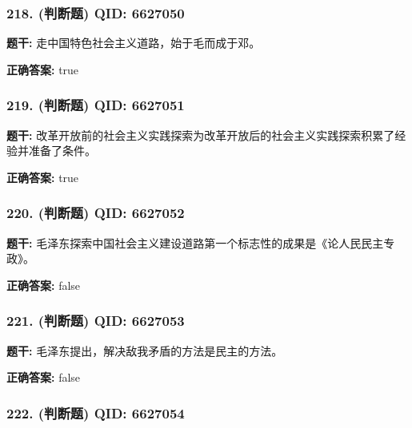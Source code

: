 \documentclass[12pt,UTF8]{ctexart}
\begin{document}
\subsubsection*{218. (判断题) \small QID: 6627050}

\textbf{题干:}
走中国特色社会主义道路，始于毛而成于邓。

\textbf{正确答案:}
true

\vspace{0.3em}\hrulefill\vspace{0.7em}

\subsubsection*{219. (判断题) \small QID: 6627051}

\textbf{题干:}
改革开放前的社会主义实践探索为改革开放后的社会主义实践探索积累了经验并准备了条件。

\textbf{正确答案:}
true

\vspace{0.3em}\hrulefill\vspace{0.7em}

\subsubsection*{220. (判断题) \small QID: 6627052}

\textbf{题干:}
毛泽东探索中国社会主义建设道路第一个标志性的成果是《论人民民主专政》。

\textbf{正确答案:}
false

\vspace{0.3em}\hrulefill\vspace{0.7em}

\subsubsection*{221. (判断题) \small QID: 6627053}

\textbf{题干:}
毛泽东提出，解决敌我矛盾的方法是民主的方法。

\textbf{正确答案:}
false

\vspace{0.3em}\hrulefill\vspace{0.7em}

\subsubsection*{222. (判断题) \small QID: 6627054}
\end{document}
